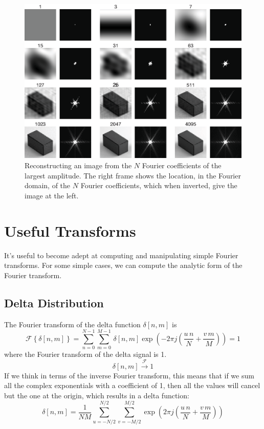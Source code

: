 \begin{figure}[t]
	\centerline{
		\includegraphics[width=1\linewidth]{figures/Image_processing_fourier/dft_b.eps}
	}
	\caption{Reconstructing an image from the $N$ Fourier coefficients of
		the largest amplitude.  The right frame shows the location, in the
		Fourier domain, of the $N$ Fourier coefficients, which when
		inverted, give the image at the left.
	}
	\label{fig:DFT_b}
\end{figure}

\section{Useful Transforms}

It's useful to become adept at computing and manipulating
simple Fourier transforms.  For some simple cases, we can compute the analytic form of the Fourier transform.

\subsection{Delta Distribution}

The Fourier transform of the delta function $\delta \left[n,m \right]$ is
\begin{equation}
	\mathcal{F} \left\{ \delta \left[n,m \right] \right\} =
	\sum_{n=0}^{N-1} \sum_{m=0}^{M-1} \, \delta \left[n,m \right]
	\exp{ \left( -2\pi j \left( \frac{u\, n}{N} + \frac{v\, m}{M} \right) \right)} = 1
\end{equation}
where the Fourier transform of the delta signal is 1.
\begin{equation}
	\delta \left[n,m \right] \xrightarrow{\mathscr{F}} 1
\end{equation}
If we think in terms of the inverse Fourier transform, this means that if we sum all the complex exponentials with a coefficient of 1, then all the values will cancel but the one at the origin, which results in a delta function:
\begin{equation}
	\delta \left[n,m \right] = \frac{1}{NM} \sum_{u=-N/2}^{N/2} \sum_{v=-M/2}^{M/2}
	\exp{ \left(2\pi j \left(\frac{u\, n}{N} + \frac{v\, m}{M} \right) \right) }
\end{equation}

